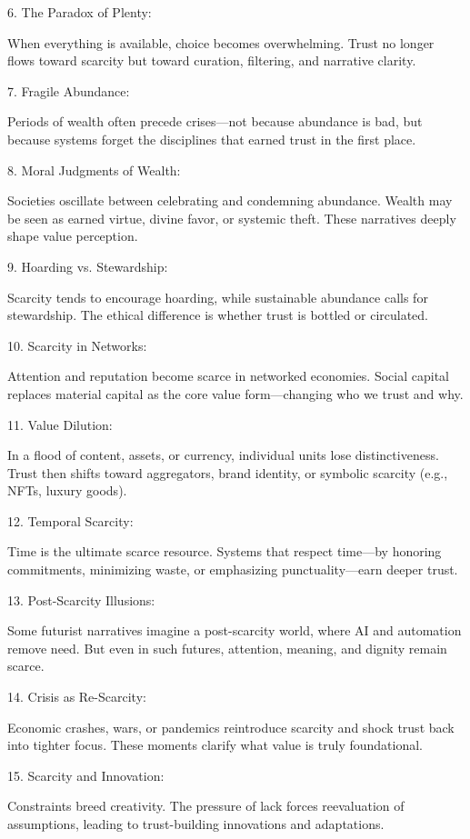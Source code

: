 \documentclass[11pt,oneside]{book}
\begin{document}
6. The Paradox of Plenty:

When everything is available, choice becomes overwhelming. Trust no longer flows toward scarcity but toward curation, filtering, and narrative clarity.


7. Fragile Abundance:

Periods of wealth often precede crises—not because abundance is bad, but because systems forget the disciplines that earned trust in the first place.


8. Moral Judgments of Wealth:

Societies oscillate between celebrating and condemning abundance. Wealth may be seen as earned virtue, divine favor, or systemic theft. These narratives deeply shape value perception.


9. Hoarding vs. Stewardship:

Scarcity tends to encourage hoarding, while sustainable abundance calls for stewardship. The ethical difference is whether trust is bottled or circulated.


10. Scarcity in Networks:

Attention and reputation become scarce in networked economies. Social capital replaces material capital as the core value form—changing who we trust and why.


11. Value Dilution:

In a flood of content, assets, or currency, individual units lose distinctiveness. Trust then shifts toward aggregators, brand identity, or symbolic scarcity (e.g., NFTs, luxury goods).


12. Temporal Scarcity:

Time is the ultimate scarce resource. Systems that respect time—by honoring commitments, minimizing waste, or emphasizing punctuality—earn deeper trust.


13. Post-Scarcity Illusions:

Some futurist narratives imagine a post-scarcity world, where AI and automation remove need. But even in such futures, attention, meaning, and dignity remain scarce.


14. Crisis as Re-Scarcity:

Economic crashes, wars, or pandemics reintroduce scarcity and shock trust back into tighter focus. These moments clarify what value is truly foundational.


15. Scarcity and Innovation:

Constraints breed creativity. The pressure of lack forces reevaluation of assumptions, leading to trust-building innovations and adaptations.
\end{document}
